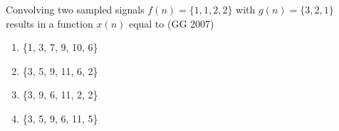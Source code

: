 \item Convolving two sampled signals $f(n) = \{1,1,2,2\}$ with $g(n) = \{3,2,1\}$ results in a function $x(n)$ equal to
\hfill 	(GG 2007)
\begin{multicols}{2}
\begin{enumerate}
\item \{1, 3, 7, 9, 10, 6\}  
\item \{3, 5, 9, 11, 6, 2\}  
\item \{3, 9, 6, 11, 2, 2\}  
\item \{3, 5, 9, 6, 11, 5\}  
\end{enumerate}
\end{multicols}

